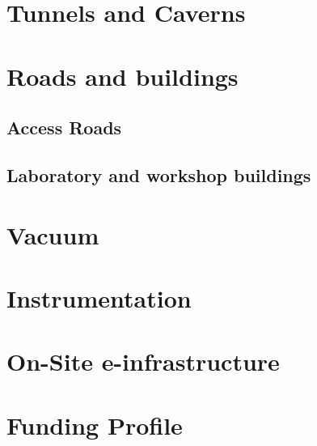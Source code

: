 
\label{part:Costing}
\chapter{Tunnels and Caverns}
\chapter{Roads and buildings}
\section{Access Roads}
\section{Laboratory and workshop buildings}
\chapter{Vacuum}
\chapter{Instrumentation}
\chapter{On-Site e-infrastructure}
\chapter{Funding Profile}